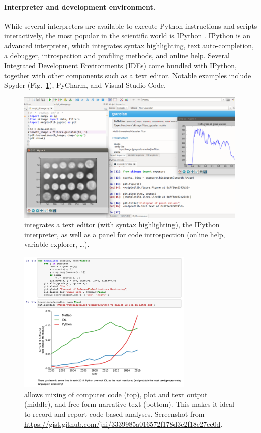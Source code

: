 \documentclass[twocolumn]{bmcart}%
\begin{document}
\paragraph{Interpreter and development environment.}

While several interpreters are available to execute Python instructions
and scripts interactively, the most popular in the scientific world is
IPython \citep{Perez2007, Rossant2015}. IPython is an advanced
interpreter, which integrates syntax highlighting, text auto-completion,
a debugger, introspection and profiling methods, and online help. Several
Integrated Development Environments (IDEs) come bundled with IPython,
together with other components such as a text editor. Notable examples
include Spyder (Fig.~\ref{fig:spyder}), PyCharm, and Visual Studio Code.

\begin{figure}[ht!]
    \centerline{\includegraphics[width=0.99\textwidth]{spyder_process}}
    \caption{ integrates a text editor (with
	syntax highlighting), the IPython interpreter, as well as a panel
	for code introspection (online help, variable explorer, \dots).
 \label{fig:spyder}}
\end{figure}

\begin{figure}[ht!]
    \centerline{\includegraphics[width=0.75\textwidth]{jupyter_example}}
    \caption{ allows mixing of computer code (top),
             plot and text output (middle), and free-form narrative text (bottom).
             This makes it ideal to record and report code-based analyses.
             Screenshot from \url{https://gist.github.com/jni/3339985a016572f178d3c2f18e27ec0d}.
 \label{fig:jupyter}}
\end{figure}
\end{document}

